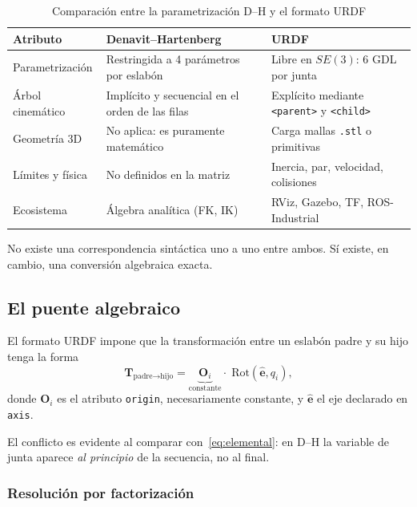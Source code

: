 \documentclass[11pt,a4paper]{article}
\newcommand{\mat}[1]{\mathbf{#1}}
\begin{document}
\begin{table}[h]
\centering
\caption{Comparación entre la parametrización D--H y el formato URDF}
\label{tab:comparacion}
\small
\begin{tabular}{@{}p{3.2cm}p{5.0cm}p{5.0cm}@{}}
\toprule
\textbf{Atributo} & \textbf{Denavit--Hartenberg} & \textbf{URDF} \\
\midrule
Parametrización & Restringida a 4 parámetros por eslabón & Libre en $SE(3)$: 6 GDL por junta \\
Árbol cinemático & Implícito y secuencial en el orden de las filas & Explícito mediante \texttt{<parent>} y \texttt{<child>} \\
Geometría 3D & No aplica: es puramente matemático & Carga mallas \texttt{.stl} o primitivas \\
Límites y física & No definidos en la matriz & Inercia, par, velocidad, colisiones \\
Ecosistema & Álgebra analítica (FK, IK) & RViz, Gazebo, TF, ROS-Industrial \\
\bottomrule
\end{tabular}
\end{table}

No existe una correspondencia sintáctica uno a uno entre ambos. Sí
existe, en cambio, una conversión algebraica exacta.

\subsection{El puente algebraico}
\label{sec:puente}

El formato URDF impone que la transformación entre un eslabón padre y su
hijo tenga la forma
\begin{equation}
\mat{T}_{\text{padre}\to\text{hijo}} =
\underbrace{\mat{O}_i}_{\text{constante}}\cdot\;
\mathrm{Rot}(\hat{\mat{e}},q_i),
\label{eq:urdf}
\end{equation}
donde $\mat{O}_i$ es el atributo \texttt{origin}, necesariamente
constante, y $\hat{\mat{e}}$ el eje declarado en \texttt{axis}.

El conflicto es evidente al comparar con~\eqref{eq:elemental}: en D--H
la variable de junta aparece \emph{al principio} de la secuencia, no al
final.

\subsubsection*{Resolución por factorización}
\end{document}
